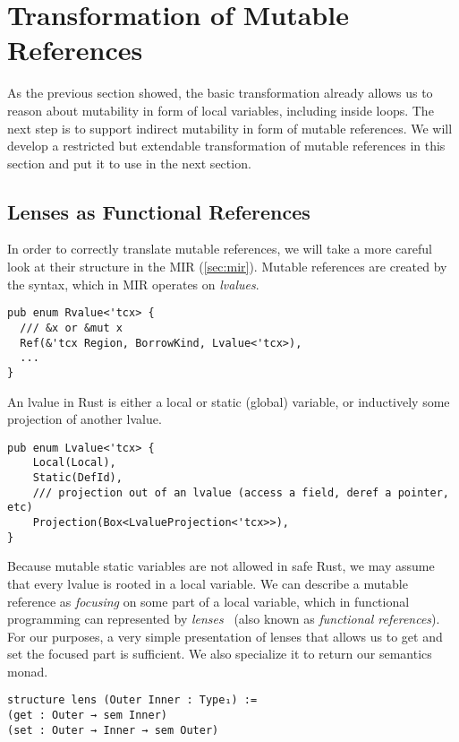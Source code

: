 \section{Transformation of Mutable References}
\label{sec:mutref}

As the previous section showed, the basic transformation already allows us to reason about mutability in
form of local variables, including inside loops. The next step is to support
indirect mutability in form of mutable references. We will develop
a restricted but extendable transformation of mutable references in this section
and put it to use in the next section.

\subsection{Lenses as Functional References}

In order to correctly translate mutable references, we will take a more careful
look at their structure in the MIR (\autoref{sec:mir}). Mutable references are
created by the  syntax, which in MIR operates on \emph{lvalues}.

\begin{verbatim}
pub enum Rvalue<'tcx> {
  /// &x or &mut x
  Ref(&'tcx Region, BorrowKind, Lvalue<'tcx>),
  ...
}
\end{verbatim}

An lvalue in Rust is either a local or static (global) variable, or inductively some
projection of another lvalue.

\begin{verbatim}
pub enum Lvalue<'tcx> {
    Local(Local),
    Static(DefId),
    /// projection out of an lvalue (access a field, deref a pointer, etc)
    Projection(Box<LvalueProjection<'tcx>>),
}
\end{verbatim}

Because mutable static variables are not allowed in safe Rust, we may assume
that every lvalue is rooted in a local variable. We can describe a mutable
reference as \emph{focusing} on some part of a local variable, which in
functional programming can represented by
\emph{lenses}~\cite{foster2005combinators} (also known as \emph{functional
  references}). For our purposes, a very simple presentation of lenses that
allows us to get and set the focused part is sufficient. We also specialize it
to return our semantics monad.

\begin{verbatim}
structure lens (Outer Inner : Type₁) :=
(get : Outer → sem Inner)
(set : Outer → Inner → sem Outer)
\end{verbatim}

